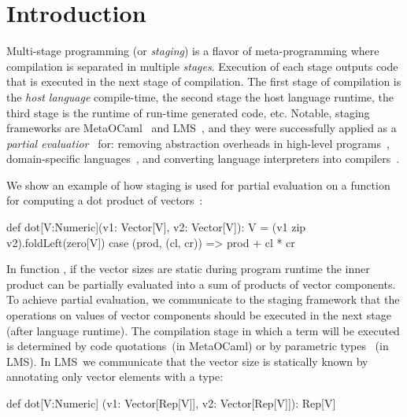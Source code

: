 \section{Introduction}
\label{sct:introduction}


 Multi-stage programming (or \emph{staging}) is a flavor of meta-programming
  where compilation is separated in multiple \emph{stages}. Execution of each
  stage outputs code that is executed in the next stage of compilation. The first
  stage of compilation is the \emph{host language} compile-time, the second stage
  the host language runtime, the third stage is the runtime of run-time generated
  code, etc. Notable, staging frameworks are MetaOCaml~\cite{taha_multi-stage_1997}
  and LMS~\cite{rompf2012lightweight}, and they were successfully applied as a
  \emph{partial evaluatior}~\cite{jones1993partial} for: removing abstraction
  overheads in high-level programs~\cite{carette2005multi,rompf2012lightweight},
  domain-specific languages~\cite{jonnalagedda2014staged}, and converting language
  interpreters into compilers~\cite{lancet,futamura1999partial}.

 We show an example of how staging is used for partial evaluation on a function
 for computing a dot product of vectors~\footnotemark[1]:\begin{lstparagraph}
def dot[V:Numeric](v1: Vector[V], v2: Vector[V]): V =
  (v1 zip v2).foldLeft(zero[V]) {
    case (prod, (cl, cr)) => prod + cl * cr
  }
 \end{lstparagraph}

In function , if the vector sizes are static during program runtime the inner product can
 be partially evaluated into a sum of products of vector components. To achieve partial evaluation,
 we communicate to the staging framework that the operations on values of vector components
 should be executed in the next stage (after language runtime). The compilation stage
 in which a term will be executed is determined by code quotations~(in MetaOCaml)
 or by parametric types ~(in LMS). In LMS~\footnotemark[2] we communicate
 that the vector size is statically known by annotating only vector elements with
 a  type:\begin{lstparagraph}
def dot[V:Numeric]
  (v1: Vector[Rep[V]], v2: Vector[Rep[V]]): Rep[V]
 \end{lstparagraph}

